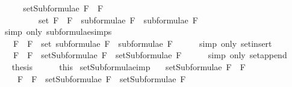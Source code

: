 \begin{isabellebody}
\ {\isacharminus}\isanewline
\ \ \isamarkupfalse%
\ {\isachardoublequoteopen}setSubformulae\ {\isacharparenleft}F{}\ \isactrlbold {\isasymor}\ F{}{\isacharparenright}\ \isanewline
\ \ \ \ \ \ \ \ {\isacharequal}\ set\ {\isacharparenleft}{\isacharparenleft}F{}\ \isactrlbold {\isasymor}\ F{}{\isacharparenright}\ {\isacharhash}\ {\isacharparenleft}subformulae\ F{}\ {\isacharat}\ subformulae\ F{}{\isacharparenright}{\isacharparenright}{\isachardoublequoteclose}\isanewline
\ \ \ \ \isamarkupfalse%
\ {\isacharparenleft}simp\ only{\isacharcolon}\ subformulae{\isachardot}simps{\isacharparenleft}{}{\isacharparenright}{\isacharparenright}\isanewline
\ \ \isamarkupfalse%
\ \isamarkupfalse%
\ {\isachardoublequoteopen}{\isasymdots}\ {\isacharequal}\ {\isacharbraceleft}F{}\ \isactrlbold {\isasymor}\ F{}{\isacharbraceright}\ {\isasymunion}\ {\isacharparenleft}set\ {\isacharparenleft}subformulae\ F{}\ {\isacharat}\ subformulae\ F{}{\isacharparenright}{\isacharparenright}{\isachardoublequoteclose}\isanewline
\ \ \ \ \isamarkupfalse%
\ {\isacharparenleft}simp\ only{\isacharcolon}\ set{\isacharunderscore}insert{\isacharparenright}\isanewline
\ \ \isamarkupfalse%
\ \isamarkupfalse%
\ {\isachardoublequoteopen}{\isasymdots}\ {\isacharequal}\ {\isacharbraceleft}F{}\ \isactrlbold {\isasymor}\ F{}{\isacharbraceright}\ {\isasymunion}\ {\isacharparenleft}setSubformulae\ F{}\ {\isasymunion}\ setSubformulae\ F{}{\isacharparenright}{\isachardoublequoteclose}\isanewline
\ \ \ \ \isamarkupfalse%
\ {\isacharparenleft}simp\ only{\isacharcolon}\ set{\isacharunderscore}append{\isacharparenright}\isanewline
\ \ \isamarkupfalse%
\ \isamarkupfalse%
\ {\isacharquery}thesis\isanewline
\ \ \ \ \isamarkupfalse%
\ this\isanewline
{}\isamarkupfalse%
%
\endisatagproof
{\isafoldproof}%
%
\isadelimproof
\isanewline
%
\endisadelimproof
\isanewline
{}\isamarkupfalse%
\ setSubformulae{\isacharunderscore}imp{\isacharcolon}\ \isanewline
\ \ {\isachardoublequoteopen}setSubformulae\ {\isacharparenleft}F{}\ \isactrlbold {\isasymrightarrow}\ F{}{\isacharparenright}\ \isanewline
\ \ \ {\isacharequal}\ {\isacharbraceleft}F{}\ \isactrlbold {\isasymrightarrow}\ F{}{\isacharbraceright}\ {\isasymunion}\ {\isacharparenleft}setSubformulae\ F{}\ {\isasymunion}\ setSubformulae\ F{}{\isacharparenright}{\isachardoublequoteclose}\isanewline

\end{isabellebody}

